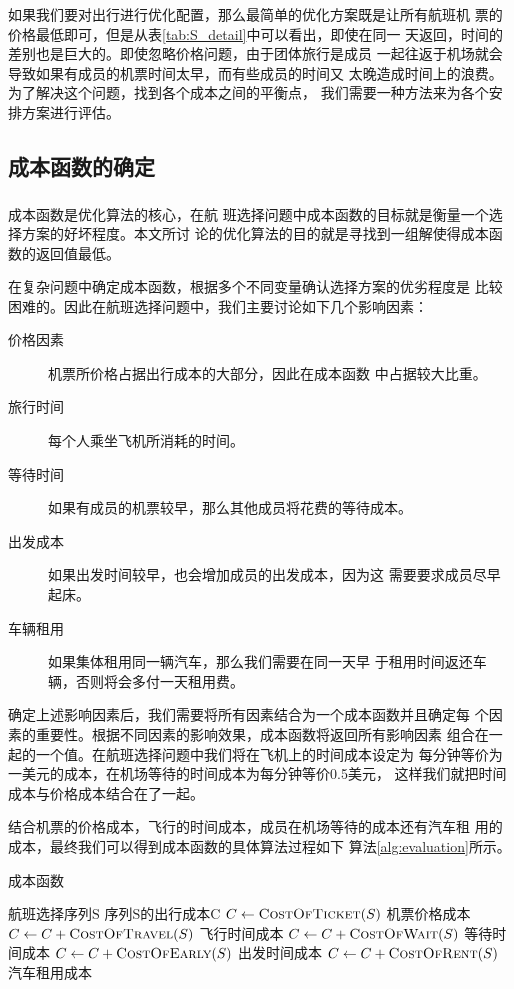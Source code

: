 \documentclass[fontset=fandol,a4paper,zihao=5]{ctexart}
\newcommand{\upcite}[1]{\textsuperscript{\textsuperscript{\cite{#1}}}}
\begin{document}
			如果我们要对出行进行优化配置，那么最简单的优化方案既是让所有航班机
            票的价格最低即可，但是从表\ref{tab:S_detail}中可以看出，即使在同一
            天返回，时间的差别也是巨大的。即使忽略价格问题，由于团体旅行是成员
            一起往返于机场就会导致如果有成员的机票时间太早，而有些成员的时间又
            太晚造成时间上的浪费。为了解决这个问题，找到各个成本之间的平衡点，
            我们需要一种方法来为各个安排方案进行评估。
		\subsection{成本函数的确定}
            \label{sec:fitness_func}
			成本函数是优化算法的核心\upcite{王凌2001智能优化算法及其应用}，在航
            班选择问题中成本函数的目标就是衡量一个选择方案的好坏程度。本文所讨
            论的优化算法的目的就是寻找到一组解使得成本函数的返回值最低。
			
			在复杂问题中确定成本函数，根据多个不同变量确认选择方案的优劣程度是
            比较困难的。因此在航班选择问题中，我们主要讨论如下几个影响因素：
			\begin{description}
				\item[价格因素] 机票所价格占据出行成本的大部分，因此在成本函数
                    中占据较大比重。
				\item[旅行时间] 每个人乘坐飞机所消耗的时间。
				\item[等待时间] 如果有成员的机票较早，那么其他成员将花费的等待成本。
				\item[出发成本] 如果出发时间较早，也会增加成员的出发成本，因为这
                    需要要求成员尽早起床。
				\item[车辆租用] 如果集体租用同一辆汽车，那么我们需要在同一天早
                    于租用时间返还车辆，否则将会多付一天租用费。
			\end{description}
			确定上述影响因素后，我们需要将所有因素结合为一个成本函数并且确定每
            个因素的重要性。根据不同因素的影响效果，成本函数将返回所有影响因素
            组合在一起的一个值。在航班选择问题中我们将在飞机上的时间成本设定为
            每分钟等价为一美元的成本，在机场等待的时间成本为每分钟等价0.5美元，
            这样我们就把时间成本与价格成本结合在了一起。
			
			结合机票的价格成本，飞行的时间成本，成员在机场等待的成本还有汽车租
            用的成本，最终我们可以得到成本函数的具体算法过程如下
            算法\ref{alg:evaluation}所示。
			\begin{algorithm}
                \begin{algorithmic}
					\caption{\label{alg:evaluation}成本函数}
					\Require $\text{航班选择序列S}$
					\Ensure $\text{序列S的出行成本C}$
					\State $C \gets \Call {CostOfTicket}{S}$ \Comment 机票价格成本
					\State $C \gets C + \Call {CostOfTravel} {S}$ \Comment 飞行时间成本
					\State $C \gets C + \Call {CostOfWait} {S}$ \Comment 等待时间成本
					\State $C \gets C + \Call {CostOfEarly} {S}$ \Comment 出发时间成本
					\State $C \gets C + \Call {CostOfRent} {S}$ \Comment 汽车租用成本
					\State {}
					\EndFunction
                \end{algorithmic}
			\end{algorithm}
		
\end{document}
